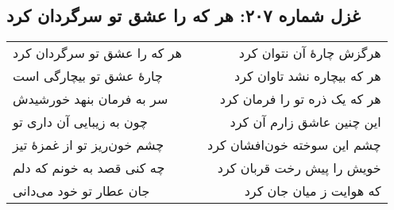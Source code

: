 \begin{center}
\section*{غزل شماره ۲۰۷: هر که را عشق تو سرگردان کرد}
\label{sec:207}
\begin{longtable}{l p{0.5cm} r}
هر که را عشق تو سرگردان کرد
&&
هرگزش چارهٔ آن نتوان کرد
\\
چارهٔ عشق تو بیچارگی است
&&
هر که بیچاره نشد تاوان کرد
\\
سر به فرمان بنهد خورشیدش
&&
هر که یک ذره تو را فرمان کرد
\\
چون به زیبایی آن داری تو
&&
این چنین عاشق زارم آن کرد
\\
چشم خون‌ریز تو از غمزهٔ تیز
&&
چشم این سوخته خون‌افشان کرد
\\
چه کنی قصد به خونم که دلم
&&
خویش را پیش رخت قربان کرد
\\
جان عطار تو خود می‌دانی
&&
که هوایت ز میان جان کرد
\\
\end{longtable}
\end{center}
